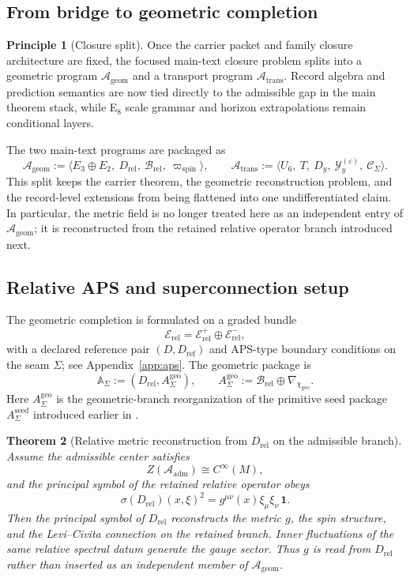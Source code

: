 \documentclass[11pt,a4paper]{article}
\newtheorem{theorem}{Theorem}[section]
\theoremstyle{definition}
\newtheorem{principle}[theorem]{Principle}
\theoremstyle{remark}
\newcommand{\Seam}{\Sigma}
\newcommand{\Ageom}{\mathcal A_{\mathrm{geom}}}
\newcommand{\Atrans}{\mathcal A_{\mathrm{trans}}}
\newcommand{\chigeo}{\chi_{\mathrm{geo}}}
\newcommand{\wspin}{\varpi_{\mathrm{spin}}}
\begin{document}
\subsection{From bridge to geometric completion}

\begin{principle}[Closure split]
Once the carrier packet and family closure architecture are fixed, the focused main-text closure problem splits into a geometric program $\Ageom$ and a transport program $\Atrans$. Record algebra and prediction semantics are now tied directly to the admissible gap in the main theorem stack, while E$_8$ scale grammar and horizon extrapolations remain conditional layers.
\end{principle}

The two main-text programs are packaged as
\[
\Ageom
:=
\langle E_3\oplus E_2,\ D_{\mathrm{rel}},\ \mathcal B_{\mathrm{rel}},\ \wspin\rangle,
\qquad
\Atrans
:=
\langle U_6,\ T,\ D_y,\ \mathcal Y_y^{(\varepsilon)},\ \mathcal C_{\Seam}\rangle.
\]
This split keeps the carrier theorem, the geometric reconstruction problem, and the record-level extensions from being flattened into one undifferentiated claim. In particular, the metric field is no longer treated here as an independent entry of $\Ageom$; it is reconstructed from the retained relative operator branch introduced next.

\subsection{Relative APS and superconnection setup}

The geometric completion is formulated on a graded bundle
\[
\mathcal E_{\mathrm{rel}}=\mathcal E_{\mathrm{rel}}^+\oplus\mathcal E_{\mathrm{rel}}^-,
\]
with a declared reference pair $(D,D_{\mathrm{ref}})$ and APS-type boundary conditions on the seam $\Seam$; see Appendix~\ref{app:aps}. The geometric package is
\[
\mathbb A_{\Seam}:=(D_{\mathrm{rel}},A_{\Sigma}^{\mathrm{geo}}),
\qquad
A_{\Sigma}^{\mathrm{geo}}:=\mathcal B_{\mathrm{rel}}\oplus\nabla_{\chigeo}.
\]
Here $A_{\Sigma}^{\mathrm{geo}}$ is the geometric-branch reorganization of the primitive seed package $A_{\Sigma}^{\mathrm{seed}}$ introduced earlier in .
\begin{theorem}[Relative metric reconstruction from $D_{\mathrm{rel}}$ on the admissible branch]
\label{thm:relative-geometric-reconstruction}
Assume the admissible center satisfies
\[
Z(\mathcal A_{\mathrm{adm}})\cong C^\infty(M),
\]
and the principal symbol of the retained relative operator obeys
\[
\sigma(D_{\mathrm{rel}})(x,\xi)^2
=
g^{\mu\nu}(x)\xi_\mu\xi_\nu\,\mathbf 1.
\]
Then the principal symbol of $D_{\mathrm{rel}}$ reconstructs the metric $g$, the spin structure, and the Levi--Civita connection on the retained branch. Inner fluctuations of the same relative spectral datum generate the gauge sector. Thus $g$ is read from $D_{\mathrm{rel}}$ rather than inserted as an independent member of $\Ageom$.
\end{theorem}
\end{document}

